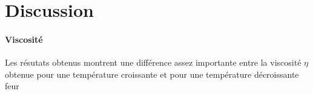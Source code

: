 \section{Discussion}

\paragraph{Viscosité} Les résutats obtenus montrent une différence assez importante entre la viscosité \(\eta\) obtenue pour une température croissante et pour une température décroissante feur
